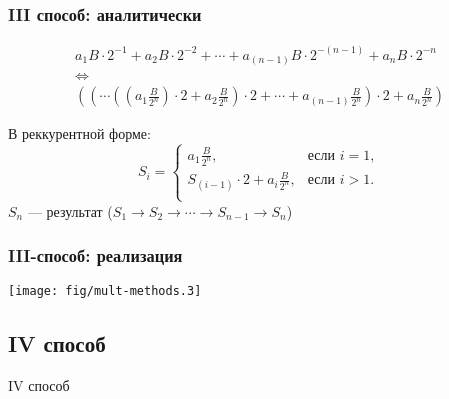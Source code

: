 \begin{frame}
    \frametitle{III способ: аналитически}

    \begin{gather*}
        a_{1}B\cdot2^{-1}+a_{2}B\cdot2^{-2}+ \cdots 
        +a_{(n-1)}B\cdot2^{-(n-1)}+a_{n}B\cdot2^{-n}
        \\
        \Leftrightarrow
        \\
        \left(\left(\cdots\left(\left(a_{1}\frac{B}{2^n}\right)\cdot 2
            +a_{2}\frac{B}{2^n}\right)\cdot 2
                + \cdots             
                    +a_{(n-1)}\frac{B}{2^n}\right)\cdot 2
                        +a_{n}\frac{B}{2^n}\right)
    \end{gather*}
    
    В реккурентной форме:
    \[
        S_i=
        \begin{cases}
            \displaystyle a_{1}\frac{B}{2^n},                     &\text{если $i=1$},\\
            \displaystyle S_{(i-1)}\cdot 2 + a_{i}\frac{B}{2^n},  &\text{если $i>1$}.\\
        \end{cases}
    \]
    $S_n$ --- результат ($S_1\to S_2\to\cdots\to S_{n-1}\to S_n$)
\end{frame}

\begin{frame}
    \frametitle{III-способ: реализация}
    
    \begin{center}
        \texttt{[image: fig/mult-methods.3]}
    \end{center}
\end{frame}


\subsection{IV способ}

\begin{frame}
    \begin{center}
        IV способ
    \end{center}
\end{frame}

